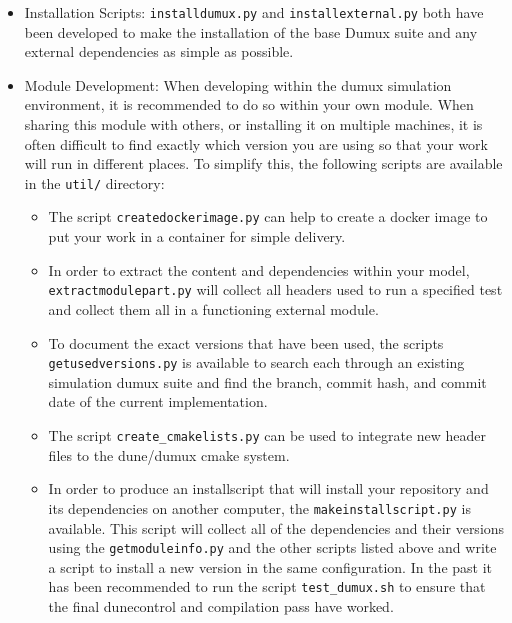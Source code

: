\begin{itemize}
  \item Installation Scripts: \texttt{installdumux.py} and \texttt{installexternal.py} both have been developed to make the installation of the base Dumux suite and any external dependencies as simple as possible. 
  \item Module Development: When developing within the dumux simulation environment, it is recommended to do so within your own module. When sharing this module with others, or installing it on multiple machines, it is often difficult to find exactly which version you are using so that your work will run in different places. To simplify this, the following scripts are available in the \texttt{util/} directory: 
  	\begin{itemize}
  		\item The script \texttt{createdockerimage.py} can help to create a docker image to put your work in a container for simple delivery.
		\item In order to extract the content and dependencies within your model, \texttt{extractmodulepart.py} will collect all headers used to run a specified test and collect them all in a functioning external module.
		\item To document the exact versions that have been used, the scripts \texttt{getusedversions.py} is available to search each through an existing simulation dumux suite and find the branch, commit hash, and commit date of the current implementation. 
		\item The script \texttt{create\_cmakelists.py} can be used to integrate new header files to the dune/dumux cmake system.
		\item In order to produce an installscript that will install your repository and its dependencies on another computer, the \texttt{makeinstallscript.py} is available. This script will collect all of the dependencies and their versions using the \texttt{getmoduleinfo.py} and the other scripts listed above and write a script to install a new version in the same configuration. In the past it has been recommended to run the script \texttt{test\_dumux.sh} to ensure that the final dunecontrol and compilation pass have worked. 
  	\end{itemize} 
\end{itemize}

